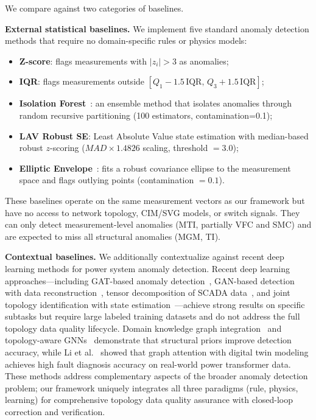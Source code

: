 \documentclass[research]{fcs}
\begin{document}
We compare against two categories of baselines.

\textbf{External statistical baselines.} We implement five standard anomaly detection methods that require no domain-specific rules or physics models:
\begin{itemize}
\item \textbf{Z-score}: flags measurements with $|z_i| > 3$ as anomalies;
\item \textbf{IQR}: flags measurements outside $[Q_1 - 1.5\,\text{IQR},\, Q_3 + 1.5\,\text{IQR}]$;
\item \textbf{Isolation Forest}~\cite{isolation_forest2008}: an ensemble method that isolates anomalies through random recursive partitioning (100 estimators, contamination=0.1);
\item \textbf{LAV Robust SE}: Least Absolute Value state estimation with median-based robust $z$-scoring ($MAD \times 1.4826$ scaling, threshold $= 3.0$);
\item \textbf{Elliptic Envelope}~\cite{rousseeuw1999fast}: fits a robust covariance ellipse to the measurement space and flags outlying points (contamination $= 0.1$).
\end{itemize}
These baselines operate on the same measurement vectors as our framework but have no access to network topology, CIM/SVG models, or switch signals. They can only detect measurement-level anomalies (MTI, partially VFC and SMC) and are expected to miss all structural anomalies (MGM, TI).

\textbf{Contextual baselines.} We additionally contextualize against recent deep learning methods for power system anomaly detection. Recent deep learning approaches---including GAT-based anomaly detection~\cite{jobe_lstm_gin2024}, GAN-based detection with data reconstruction~\cite{xu_bayesian_gan2024}, tensor decomposition of SCADA data~\cite{tensor_scada2023}, and joint topology identification with state estimation~\cite{karimi_topo_se2021}---achieve strong results on specific subtasks but require large labeled training datasets and do not address the full topology data quality lifecycle. Domain knowledge graph integration~\cite{timeseries_anomaly_smartgrid2025} and topology-aware GNNs~\cite{donon_gnn_pf2019} demonstrate that structural priors improve detection accuracy, while Li et al.~\cite{digital_twin_gat2026} showed that graph attention with digital twin modeling achieves high fault diagnosis accuracy on real-world power transformer data. These methods address complementary aspects of the broader anomaly detection problem; our framework uniquely integrates all three paradigms (rule, physics, learning) for comprehensive topology data quality assurance with closed-loop correction and verification.
\end{document}
